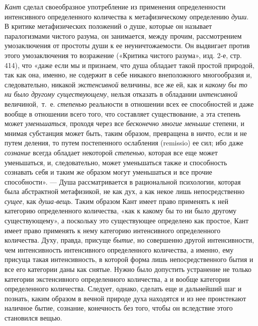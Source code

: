 {{\em Кант} сделал своеобразное употребление из
применения определенности интенсивного определенного количества к
метафизическому определению {\em души}. В критике
метафизических положений о душе, которые он называет паралогизмами чистого
разума, он занимается, между прочим, рассмотрением умозаключения от
простоты души к ее неуничтожаемости. Он выдвигает против этого
умозаключения то возражение («Критика чистого разума», изд. 2-е, стр. 414),
что «даже если мы и признаем, что душа обладает такой простой природой, так
как она, именно, не содержит в себе никакого внеположного многообразия и,
следовательно, никакой {\em экстенсивной} величины, все
же ей, как и {\em какому бы то ни было другому
существующему}, нельзя отказать в обладании
{\em интенсивной} величиной,~т.~е.
{\em степенью} реальности в отношении всех ее
способностей и даже вообще в отношении всего того, что составляет
существование, а эта степень может {\em уменьшаться},
проходя через все {\em бесконечно многие меньшие}
степени, и мнимая субстанция может быть, таким образом, превращена в ничто,
если и не путем деления, то путем постепенного ослабления (remissio) ее
сил; ибо даже {\em сознание} всегда обладает некоторой
{\em степенью}, которая все еще может уменьшаться, и,
следовательно, может уменьшаться также и способность сознавать себя и таким
же образом могут уменьшаться и все прочие способности». — Душа
рассматривается в рациональной психологии, которая была абстрактной
метафизикой, не как дух, а как некое лишь непосредственно
{\em сущее}, как {\em душа-вещь}.
Таким образом Кант имеет право применять к ней категорию определенного
количества, «как к какому бы то ни было другому существующему», а поскольку
это существующее определено как простое, Кант имеет право применять к нему
категорию интенсивного определенного количества. Духу, правда, присуще
{\em бытие}, но совершенно другой интенсивности, чем
интенсивность интенсивного определенного количества, а именно, ему присуща
такая интенсивность, в которой форма лишь непосредственного бытия и все его
категории даны как снятые. Нужно было допустить устранение не только
категории экстенсивного определенного количества, а и вообще категории
определенного количества. Следует, однако, сделать еще и дальнейший шаг и
познать, каким образом в вечной природе духа находятся и из нее проистекают
наличное бытие, сознание, конечность без того, чтобы он вследствие этого
становился вещью.

}
